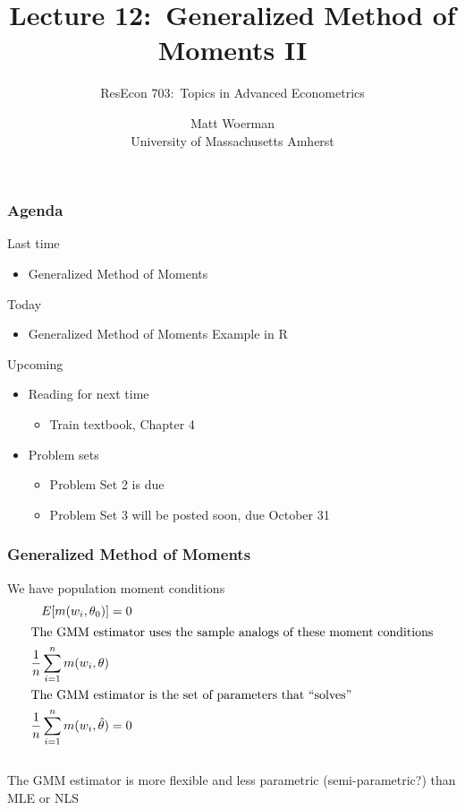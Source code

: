 \documentclass{beamer}\usepackage[]{graphicx}\usepackage[]{color}
\title[Lecture 12:\ Generalized Method of Moments II]{Lecture 12:\ Generalized Method of Moments II}
\author[ResEcon 703:\ Advanced Econometrics]{ResEcon 703:\ Topics in Advanced Econometrics}
\date{Matt Woerman\\University of Massachusetts Amherst}
\begin{document}
{ 
\begin{frame}[noframenumbering]
    \titlepage
\end{frame}
}

\begin{frame}\frametitle{Agenda}
    Last time
    \begin{itemize}
        \item Generalized Method of Moments
    \end{itemize}
    \vspace{2ex}
    Today
    \begin{itemize}
        \item Generalized Method of Moments Example in R
    \end{itemize}
    \vspace{2ex}
    Upcoming
    \begin{itemize}
        \item Reading for next time
        \begin{itemize}
            \item Train textbook, Chapter 4
        \end{itemize}
        \item Problem sets
        \begin{itemize}
            \item Problem Set 2 is due
            \item Problem Set 3 will be posted soon, due October 31
        \end{itemize}
    \end{itemize}
\end{frame}

\begin{frame}\frametitle{Generalized Method of Moments}
    We have population moment conditions
    \begin{align*}
        E[m(w_i, \theta_0)] &= 0 \\
        \intertext{The GMM estimator uses the sample analogs of these moment conditions}
        \frac{1}{n} \sum_{i = 1}^n m(w_i, \theta) & \\
        \intertext{The GMM estimator is the set of parameters that ``solves''}
        \frac{1}{n} \sum_{i = 1}^n m(w_i, \hat{\theta}) &= 0
    \end{align*} \\
    \vspace{2ex}
    The GMM estimator is more flexible and less parametric (semi-parametric?) than MLE or NLS
\end{frame}
\end{document}

